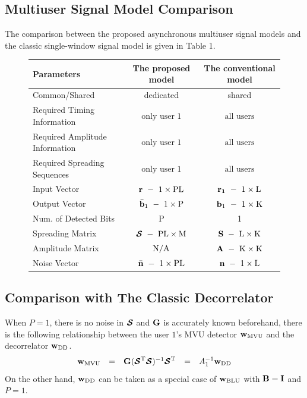 \documentclass[a4paper,10pt,fleqn, twocolumn]{IEEETran}
\newcommand{\bb}{{\bf b}}
\newcommand{\bG}{{\bf G}}
\newcommand{\bn}{{\bf n}}
\newcommand{\bw}{{\bf w}}
\newcommand{\bS}{{\bf S}}
\newcommand{\bI}{{\bf I}}
\newcommand{\bB}{{\bf B}}
\newcommand{\bcS}{{\mbox {\boldmath ${\cal S}$}}}
\begin{document}
\subsection{Multiuser Signal Model Comparison}
The comparison between the proposed asynchronous multiuser signal
models and the classic single-window signal model is given in
Table 1.
\begin{figure}[t]\label{ModelComp}
\begin{center}
\begin{tabular}{lcc}
Parameters&The proposed model&The conventional model\\
\hline
Common/Shared& dedicated& shared\\
Required Timing Information&$\mbox{only user 1}$ & $\mbox{all users}$\\
Required Amplitude Information&$\mbox{only user 1}$ & $\mbox{all users}$\\
Required Spreading Sequences&$\mbox{only user 1}$ & $\mbox{all users}$\\
\hline
Input Vector&$\bf{r}\ -\ \rm 1\times\rm PL$&$\bf{r}_1\ -\ \rm 1\times\rm L$\\
Output Vector &$\bar\bb_1\ -\ 1\times\rm P$&$\bb_1\ -\ 1\times\rm K$\\
Num. of Detected Bits& P & 1\\
Spreading Matrix &$\bcS\ -\ \rm PL\times\rm M$&$\bS\ -\ \rm L\times\rm K$\\
Amplitude Matrix &$\rm N/A$&$\bf{A}\ -\ \rm K\times\rm K$\\
Noise Vector &$\bar\bn\ -\ 1\times\rm PL$&$\bn\ -\
1\times\rm L$\\
\hline
\end{tabular}
\end{center}
\end{figure}
\subsection{Comparison with The Classic Decorrelator}
When $P=1$, there is no noise in $\bcS$ and $\bG$ is accurately
known beforehand, there is the following relationship between the
user $1$'s MVU detector $\bw_{\rm MVU}$ and the decorrelator
$\bw_{\rm DD}$.
\begin{equation}
\begin{array}{rcccl}
\bw_{\rm MVU}&=&\bG(\bcS^{\rm T}\bcS)^{-1}\bcS^{\rm
T}&=&A_1^{-1}\bw_{\rm DD}
\end{array}
\end{equation} \label{wN0}
\noindent On the other hand, $\bw_{\rm DD}$ can be taken as a
special case of $\bw_{\rm BLU}$ with $\bB =\bI$ and $P=1$.
\end{document}
